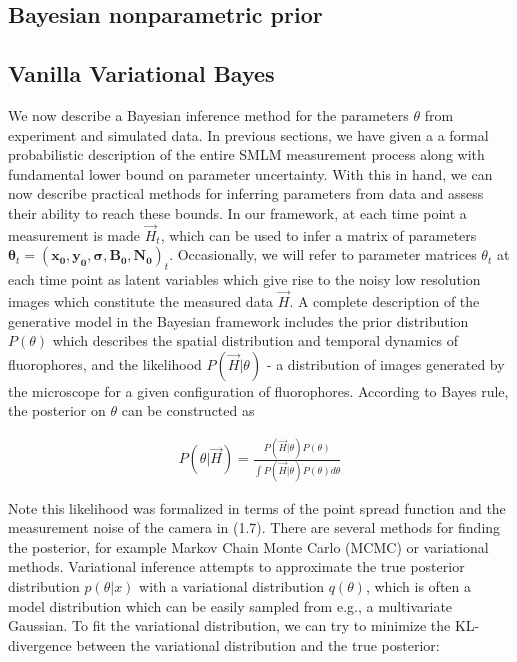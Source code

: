 \documentclass{ucetd}
\begin{document}
\subsection{Bayesian nonparametric prior}

\subsection{Vanilla Variational Bayes}

We now describe a Bayesian inference method for the parameters $\theta$ from experiment and simulated data. In previous sections, we have given a a formal probabilistic description of the entire SMLM measurement process along with fundamental lower bound on parameter uncertainty. With this in hand, we can now describe practical methods for inferring parameters from data and assess their ability to reach these bounds.  In our framework, at each time point a measurement is made $\vec{H}_{t}$, which can be used to infer a matrix of parameters $\bm{\theta}_{t} = (\bm{x_{0}},\bm{y_{0}},\bm{\sigma},\bm{B_{0}},\bm{N_{0}})_{t}$. Occasionally, we will refer to parameter matrices $\theta_{t}$ at each time point as latent variables which give rise to the noisy low resolution images which constitute the measured data $\vec{H}$. A complete description of the generative model in the Bayesian framework includes the prior distribution $P(\theta)$ which describes the spatial distribution and temporal dynamics of fluorophores, and the likelihood $P(\vec{H}|\theta)$ - a distribution of images generated by the microscope for a given configuration of fluorophores. According to Bayes rule, the posterior on $\theta$ can be constructed as

\begin{align}
P(\theta|\vec{H}) = \frac{P(\vec{H}|\theta)P(\theta)}{\int P(\vec{H}|\theta)P(\theta) d\theta}
\end{align}

Note this likelihood was formalized in terms of the point spread function and the measurement noise of the camera in (1.7). There are several methods for finding the posterior, for example Markov Chain Monte Carlo (MCMC) or variational methods. Variational inference attempts to approximate the true posterior distribution $p(\theta|x)$ with a variational distribution $q(\theta)$, which is often a model distribution which can be easily sampled from e.g., a multivariate Gaussian. To fit the variational distribution, we can try to minimize the KL-divergence between the variational distribution and the true posterior:
\end{document}
